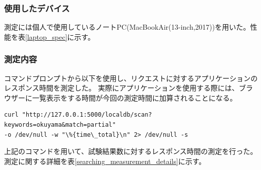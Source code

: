 \subsubsection{使用したデバイス}

測定には個人で使用しているノートPC(MacBookAir(13-inch,2017))を用いた。性能を表\ref{laptop_spec}に示す。

\begin{table}[tbp]
\caption[ノートPCの性能]{ノートPCの性能}
\label{laptop_spec}
\end{table}


\subsubsection{測定内容}

コマンドプロンプトから以下を使用し、リクエストに対するアプリケーションのレスポンス時間を測定した。
実際にアプリケーションを使用する際には、ブラウザーに一覧表示をする時間が今回の測定時間に加算されることになる。

\begin{lstlisting}
curl "http://127.0.0.1:5000/localdb/scan?keywords=okuyama&match=partial" 
-o /dev/null -w "\%{time\_total}\n" 2> /dev/null -s
\end{lstlisting}

上記のコマンドを用いて、試験結果数に対するレスポンス時間の測定を行った。
測定に関する詳細を表\ref{searching_measurement_details}に示す。


